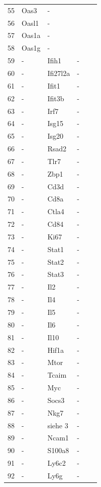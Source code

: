 \begin{table}[ht]
{\begin{tabular}{llllll}
        55 &  Oas3 & - \\
        56 &  Oasl1 & - \\
        57 &  Oas1a & - \\
        58 &  Oas1g & - \\
        59 &  - & Ifih1 & - \\
        60 &  - & Ifi27l2a & - \\
        61 &  - & Ifit1 & - \\
        62 &  - & Ifit3b & - \\
        63 &  - & Irf7 & - \\
        64 &  - & Isg15 & - \\
        65 &  - & Isg20 & - \\
        66 &  - & Rsad2 & - \\
        67 &  - & Tlr7 & - \\
        68 &  - & Zbp1 & - \\
        69 &  - & Cd3d & - \\
        70 &  - & Cd8a & - \\
        71 &  - & Ctla4 & - \\
        72 &  - & Cd84 & - \\
        73 &  - & Ki67 & - \\
        74 &  - & Stat1 & - \\
        75 &  - & Stat2 & - \\
        76 &  - & Stat3 & - \\
        77 &  - & Il2 & - \\
        78 &  - & Il4 & - \\
        79 &  - & Il5 & - \\
        80 &  - & Il6 & - \\
        81 &  - & Il10 & - \\
        82 &  - & Hif1a & - \\
        83 &  - & Mtor & - \\
        84 &  - & Tcaim & - \\
        85 &  - & Myc & - \\
        86 &  - & Socs3 & - \\
        87 &  - & Nkg7 & - \\
        88 &  - & siehe 3 & - \\
        89 &  - & Ncam1 & - \\
        90 &  - & S100a8 & - \\
        91 &  - & Ly6c2 & - \\
        92 &  - & Ly6g & - \\

\end{tabular}}
\end{table}
